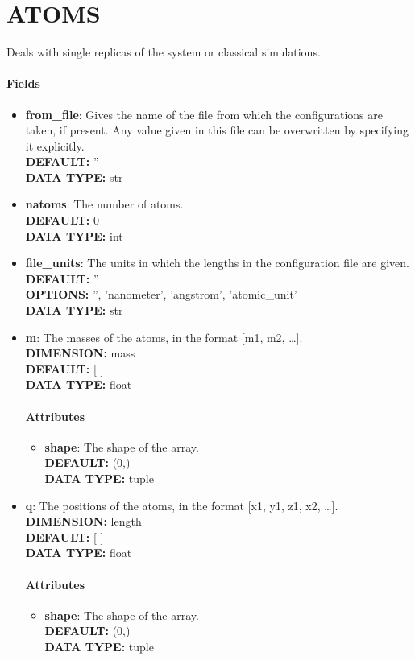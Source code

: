 \section{ATOMS}
\label{ATOMS}
Deals with single replicas of the system or classical simulations.
\paragraph{Fields}
 \begin{itemize}
\item {\bf from\_file}:
 Gives the name of the file from which the configurations are taken, if present. Any value given in this file can be overwritten by specifying it explicitly.
{\\ \bf DEFAULT: }''
{\\ \bf DATA TYPE: }str
\item {\bf natoms}:
 The number of atoms.
{\\ \bf DEFAULT: }0
{\\ \bf DATA TYPE: }int
\item {\bf file\_units}:
 The units in which the lengths in the configuration file are given.
{\\ \bf DEFAULT: }''
{\\ \bf OPTIONS: }'', 'nanometer', 'angstrom', 'atomic\_unit'
{\\ \bf DATA TYPE: }str
\item {\bf m}:
 The masses of the atoms, in the format [m1, m2, \ldots  ].
{\\ \bf DIMENSION: }mass
{\\ \bf DEFAULT: }[ ]
{\\ \bf DATA TYPE: }float
\paragraph{Attributes}
 \begin{itemize}
\item {\bf shape}:
 The shape of the array.
{\\ \bf DEFAULT: }(0,)
{\\ \bf DATA TYPE: }tuple
\end{itemize}
 
\item {\bf q}:
 The positions of the atoms, in the format [x1, y1, z1, x2, \ldots  ].
{\\ \bf DIMENSION: }length
{\\ \bf DEFAULT: }[ ]
{\\ \bf DATA TYPE: }float
\paragraph{Attributes}
 \begin{itemize}
\item {\bf shape}:
 The shape of the array.
{\\ \bf DEFAULT: }(0,)
{\\ \bf DATA TYPE: }tuple
\end{itemize}
 

\end{itemize}
